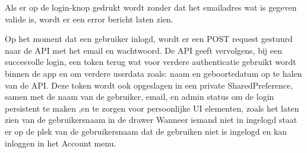 \documentclass[dutch]{report}
\begin{document}
	Als er op de login-knop gedrukt wordt zonder dat het emailadres wat is gegeven valide is, wordt er een error bericht laten zien.
	
	Op het moment dat een gebruiker inlogd, wordt er een POST request gestuurd naar de API met het email en wachtwoord. De API geeft vervolgens,
	bij een succesvolle login, een token terug wat voor verdere authenticatie gebruikt wordt binnen de app en om verdere userdata zoals: naam en geboortedatum
	op te halen van de API.
	Deze token wordt ook opgeslagen in een private SharedPreference, samen met de naam van de gebruiker, email, en admin status om de login persistent te maken
	,en te zorgen voor persoonlijke UI elementen, zoals het laten zien van de gebruikersnaam in de drawer 
	Wanneer iemand niet in ingelogd staat er op de plek van de gebruikersnaam dat de gebruiken niet is ingelogd en kan inloggen in het Account menu. 
	
\end{document}
